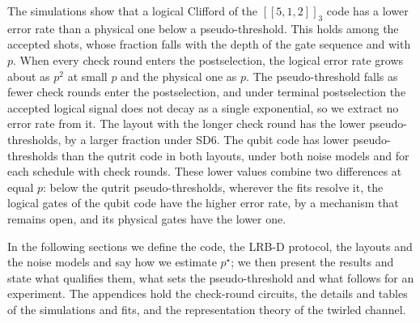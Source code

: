 The simulations show that a logical Clifford of the $[[5,1,2]]_3$ code has a lower error rate than a physical one below a pseudo-threshold. This holds among the accepted shots, whose fraction falls with the depth of the gate sequence and with $p$. When every check round enters the postselection, the logical error rate grows about as $p^2$ at small $p$ and the physical one as $p$. The pseudo-threshold falls as fewer check rounds enter the postselection, and under terminal postselection the accepted logical signal does not decay as a single exponential, so we extract no error rate from it. The layout with the longer check round has the lower pseudo-thresholds, by a larger fraction under SD6. The qubit code has lower pseudo-thresholds than the qutrit code in both layouts, under both noise models and for each schedule with check rounds. These lower values combine two differences at equal $p$: below the qutrit pseudo-thresholds, wherever the fits resolve it, the logical gates of the qubit code have the higher error rate, by a mechanism that remains open, and its physical gates have the lower one.

In the following sections we define the code, the LRB-D protocol, the layouts and the noise models and say how we estimate $p^\star$; we then present the results and state what qualifies them, what sets the pseudo-threshold and what follows for an experiment. The appendices hold the check-round circuits, the details and tables of the simulations and fits, and the representation theory of the twirled channel.